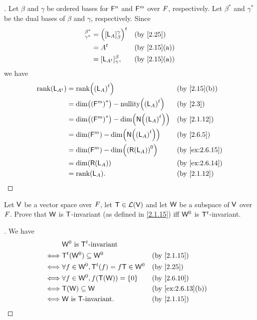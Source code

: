\begin{proof}[]
	Let \(\beta\) and \(\gamma\) be ordered bases for \(\mathsf{F}^n\) and \(\mathsf{F}^m\) over \(\mathit{F}\), respectively.
	Let \(\beta^*\) and \(\gamma^*\) be the dual bases of \(\beta\) and \(\gamma\), respectively.
	Since
	\begin{align*}
		[\tp{\pa{\L_A}}]_{\gamma^*}^{\beta^*} & = \tp{\pa{[\L_A]_{\beta}^{\gamma}}} &  & \by{2.25}    \\
		                                      & = \tp{A}                            &  & \by{2.15}[a] \\
		                                      & = [\L_{\tp{A}}]_{\gamma}^{\beta},   &  & \by{2.15}[a]
	\end{align*}
	we have
	\begin{align*}
		\rk{\L_{\tp{A}}} & = \rk{\tp{\pa{\L_A}}}                                     &  & \by{2.15}[b]   \\
		                 & = \dim\pa{\pa{\vs{F}^m}^*} - \nt{\tp{\pa{\L_A}}}          &  & \by{2.3}       \\
		                 & = \dim\pa{\pa{\vs{F}^m}^*} - \dim\pa{\ns{\tp{\pa{\L_A}}}} &  & \by{2.1.12}    \\
		                 & = \dim\pa{\vs{F}^m} - \dim\pa{\ns{\tp{\pa{\L_A}}}}        &  & \by{2.6.5}     \\
		                 & = \dim\pa{\vs{F}^m} - \dim\pa{\pa{\rg{\L_A}}^0}           &  & \by{ex:2.6.15} \\
		                 & = \dim\pa{\rg{\L_A}}                                      &  & \by{ex:2.6.14} \\
		                 & = \rk{\L_A}.                                              &  & \by{2.1.12}
	\end{align*}
\end{proof}

\begin{ex}\label{ex:2.6.17}
	Let \(\mathsf{V}\) be a vector space over \(\mathit{F}\), let \(\mathsf{T} \in \mathcal{L}(\mathsf{V})\) and let \(\mathsf{W}\) be a subspace of \(\mathsf{V}\) over \(\mathit{F}\).
	Prove that \(\mathsf{W}\) is \(\mathsf{T}\)-invariant (as defined in \cref{2.1.15}) iff \(\mathsf{W}^0\) is \({\mathsf{T}}^{t}\)-invariant.
\end{ex}

\begin{proof}[]
	We have
	\begin{align*}
		     & \W^0 \text{ is } \tp{\T} \text{-invariant}                            \\
		\iff & \tp{\T}(\W^0) \subseteq \W^0                   &  & \by{2.1.15}       \\
		\iff & \forall f \in \W^0, \tp{\T}(f) = f \T \in \W^0 &  & \by{2.25}         \\
		\iff & \forall f \in \W^0, f(\T(\W)) = \set{0}        &  & \by{2.6.10}       \\
		\iff & \T(\W) \subseteq \W                            &  & \by{ex:2.6.13}[b] \\
		\iff & \W \text{ is } \T \text{-invariant}.           &  & \by{2.1.15}
	\end{align*}
\end{proof}

